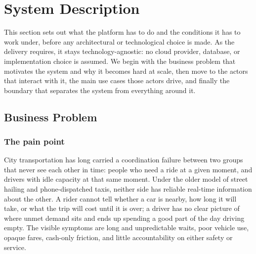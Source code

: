 %
%
\section{System Description}
\label{sec:system-description}

This section sets out what the platform has to do and the conditions it has
to work under, before any architectural or technological choice is made. As
the delivery requires, it stays technology-agnostic: no cloud provider,
database, or implementation choice is assumed. We begin with the business
problem that motivates the system and why it becomes hard at scale, then move
to the actors that interact with it, the main use cases those actors drive,
and finally the boundary that separates the system from everything around it.

\subsection{Business Problem}
\label{subsec:business-problem}

\subsubsection*{The pain point}

City transportation has long carried a coordination failure between two
groups that never see each other in time: people who need a ride at a given
moment, and drivers with idle capacity at that same moment. Under the older
model of street hailing and phone-dispatched taxis, neither side has reliable
real-time information about the other. A rider cannot tell whether a car is
nearby, how long it will take, or what the trip will cost until it is over; a
driver has no clear picture of where unmet demand sits and ends up spending a
good part of the day driving empty. The visible symptoms are long and
unpredictable waits, poor vehicle use, opaque fares, cash-only friction, and
little accountability on either safety or service.

